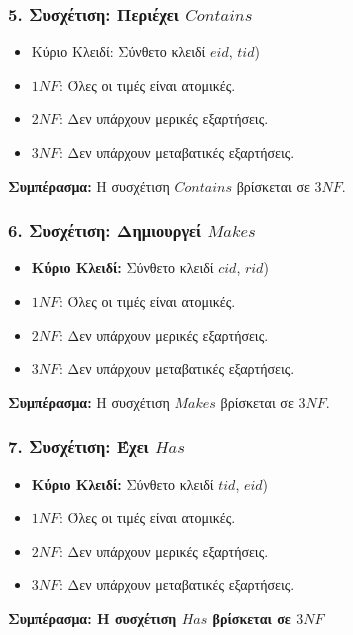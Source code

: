 \documentclass{article}
\begin{document}
\subsubsection*{5. Συσχέτιση: Περιέχει $Contains$}
\begin{itemize}
    \item Κύριο Κλειδί: Σύνθετο κλειδί $eid$, $tid$)
    \item $1NF$: Όλες οι τιμές είναι ατομικές.
    \item $2NF$: Δεν υπάρχουν μερικές εξαρτήσεις.
    \item $3NF$: Δεν υπάρχουν μεταβατικές εξαρτήσεις.
\end{itemize}
\textbf{Συμπέρασμα:} Η συσχέτιση $Contains$ βρίσκεται σε $3NF$.

\subsubsection*{6. Συσχέτιση: Δημιουργεί $Makes$}
\begin{itemize}
    \item \textbf{Κύριο Κλειδί:} Σύνθετο κλειδί $cid$, $rid$)
    \item $1NF$: Όλες οι τιμές είναι ατομικές.
    \item $2NF$: Δεν υπάρχουν μερικές εξαρτήσεις.
    \item $3NF$: Δεν υπάρχουν μεταβατικές εξαρτήσεις.
\end{itemize}
\textbf{Συμπέρασμα:} Η συσχέτιση $Makes$ βρίσκεται σε $3NF$.

\subsubsection*{7. Συσχέτιση: Έχει $Has$}
\begin{itemize}
    \item \textbf{Κύριο Κλειδί:} Σύνθετο κλειδί $tid$, $eid$)
    \item $1NF$: Όλες οι τιμές είναι ατομικές.
    \item $2NF$: Δεν υπάρχουν μερικές εξαρτήσεις.
    \item $3NF$: Δεν υπάρχουν μεταβατικές εξαρτήσεις.
\end{itemize}
\textbf{Συμπέρασμα: Η συσχέτιση $Has$ βρίσκεται σε $3NF$}
\end{document}
